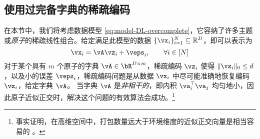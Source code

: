\documentclass[../../book-main.tex]{subfiles}
\begin{document}
%

\subsection{使用过完备字典的稀疏编码} 

在本节中，我们将考虑数据模型 \eqref{eq:model-DL-overcomplete}，它容纳了许多主题或\textit{原子}的稀疏线性组合。给定满足此模型的数据 \(\{\vx_{i}\}_{i = 1}^{N} \subseteq \R^{D}\)，即可以表示为
\begin{equation}\label{eq:vectorized_sparse_dl_dgp}
    \vx_{i} = \vA\vz_{i} + \veps_{i}, \qquad \forall i \in [N]
\end{equation}
对于某个具有 $m$ 个原子的字典 $\vA \in \bR^{D \times m}$，稀疏编码 $\vz_i$ 使得 $\norm{\vz_i}_0 \leq d$，以及小的误差 $\veps_i$，稀疏编码问题是从数据 $\vx_i$ 中尽可能准确地恢复编码 $\vz_i$，给定字典 $\vA$。
当字典 \(\vA\) 是\textit{非相干的}，即内积 \(\va_{i}^{\top}\va_{j}\) 均匀地小，因此原子近似正交时，解决这个问题的有效算法会成功。\footnote{事实证明，在高维空间中，打包数量远大于环境维度的近似正交向量是相当容易的 \cite{Wright-Ma-2022}。}

\end{document}
